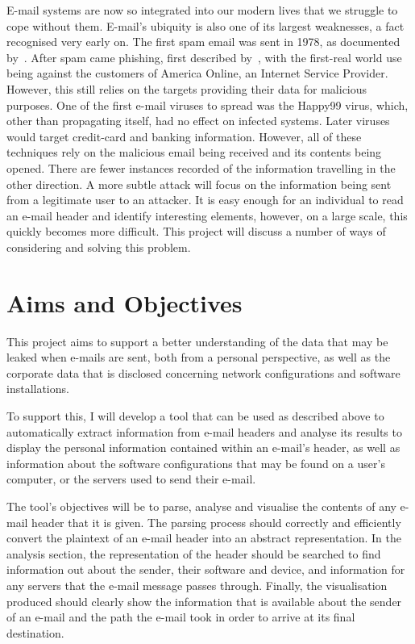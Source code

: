 \documentclass[a4paper,DIV=12,BCOR=7mm,abstract=yes,twoside,11pt]{scrreprt}
\begin{document}
E-mail systems are now so integrated into our modern lives that we struggle to
cope without them.  E-mail's ubiquity is also one of its largest weaknesses, a
fact recognised very early on.  The first spam email was sent in 1978, as
documented by~\cite{templeton}.  After spam came phishing, first described
by~\cite{felix1987system}, with the first-real world use being against the
customers of America Online, an Internet Service Provider.  However, this still
relies on the targets providing their data for malicious purposes. One of the
first e-mail viruses to spread was the Happy99 virus, which, other than
propagating itself, had no effect on infected systems. Later viruses would
target credit-card and banking information. However, all of these techniques
rely on the malicious email being received and its contents being opened.
There are fewer instances recorded of the information travelling in the other
direction.  A more subtle attack will focus on the information being sent from
a legitimate user to an attacker. It is easy enough for an individual to read
an e-mail header and identify interesting elements, however, on a large scale,
this quickly becomes more difficult.  This project will discuss a number of
ways of considering and solving this problem.

\section{Aims and Objectives}

This project aims to support a better understanding of the data that may be
leaked when e-mails are sent, both from a personal perspective, as well as the
corporate data that is disclosed concerning network configurations and software
installations.

To support this, I will develop a tool that can be used as described above to
automatically extract information from e-mail headers and analyse its results to
display the personal information contained within an e-mail's header, as well as
information about the software configurations that may be found on a user's
computer, or the servers used to send their e-mail.

The tool's objectives will be to parse, analyse and visualise the contents of
any e-mail header that it is given.  The parsing process should correctly and
efficiently convert the plaintext of an e-mail header into an abstract
representation.  In the analysis section, the representation of the header
should be searched to find information out about the sender, their software and
device, and information for any servers that the e-mail message passes through.
Finally, the visualisation produced should clearly show the information that is
available about the sender of an e-mail and the path the e-mail took in order to
arrive at its final destination.
\end{document}
